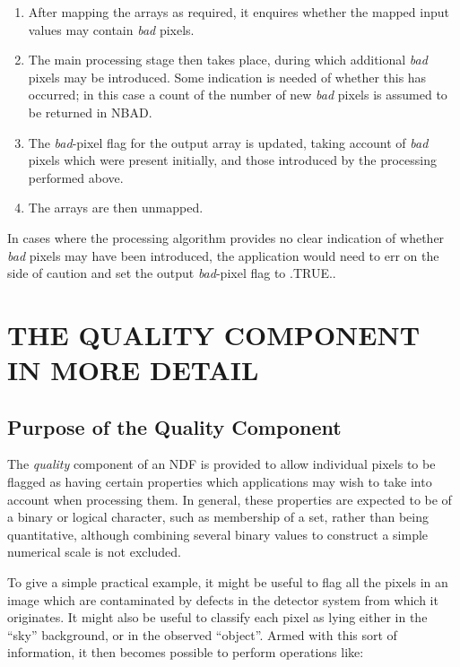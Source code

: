 \documentclass[twoside,11pt]{article}
\newcommand{\xlabel}[1]{}
\newcommand{\st}[1]{{\em{#1}}}
\begin{document}
\begin{enumerate}

\item
After mapping the arrays as required, it enquires whether the mapped input
values may contain \st{bad\/} pixels. 

\item
The main processing stage then takes place, during which additional
\st{bad\/} pixels may be introduced.  
Some indication is needed of whether this has occurred; in this case a count
of the number of new \st{bad\/} pixels is assumed to be returned in NBAD. 

\item
The \st{bad\/}-pixel flag for the output array is updated, taking account of
\st{bad\/} pixels which were present initially, and those introduced by the
processing performed above. 

\item
The arrays are then unmapped.

\end{enumerate}

In cases where the processing algorithm provides no clear indication of
whether \st{bad\/} pixels may have been introduced, the application would need
to err on the side of caution and set the output \st{bad\/}-pixel flag to
.TRUE.. 


\section{\xlabel{the_quality_component_in_more_detail}THE QUALITY COMPONENT IN MORE DETAIL}

\subsection{\xlabel{purpose_of_the_quality_component}Purpose of the Quality Component}

The \st{quality\/} component of an NDF is provided to allow individual pixels
to be flagged as having certain properties which applications may wish to take
into account when processing them. 
In general, these properties are expected to be of a binary or logical
character, such as membership of a set, rather than being quantitative, 
although combining several binary values to construct a simple numerical 
scale is not excluded.

To give a simple practical example, it might be useful to flag all the
pixels in an image which are contaminated by defects in the detector system
from which it originates. 
It might also be useful to classify each pixel as lying either in the 
``sky'' background, or in the observed ``object''.
Armed with this sort of information, it then becomes possible to perform 
operations like:
\end{document}
